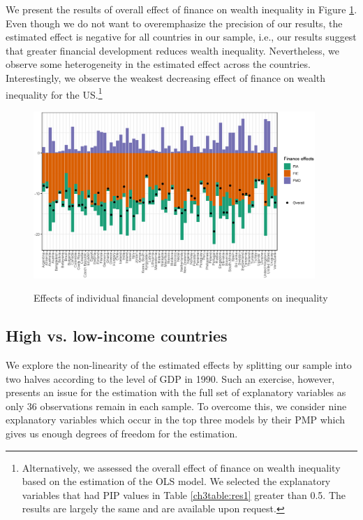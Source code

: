\begin{refsection}
We present the results of overall effect of finance on wealth inequality in Figure \ref{ch3fig:finance_effect}. Even though we do not want to overemphasize the precision of our results, the estimated effect is negative for all countries in our sample, i.e., our results suggest that greater financial development reduces wealth inequality. Nevertheless, we observe some heterogeneity in the estimated effect across the countries. Interestingly, we observe the weakest decreasing effect of finance on wealth inequality for the \ac{US}.\footnote{Alternatively, we assessed the overall effect of finance on wealth inequality based on the estimation of the \ac{OLS} model. We selected the explanatory variables that had \ac{PIP} values in Table \ref{ch3table:res1} greater than 0.5. The results are largely the same and are available upon request.}

\begin{figure}
\begin{center}
\caption{Effects of individual financial development components on inequality}
\includegraphics[width=0.95\textwidth]{figures/ch3/finance_effect.eps}
\label{ch3fig:finance_effect}
\end{center}
\end{figure}

\subsection{High vs. low-income countries}
We explore the non-linearity of the estimated effects by splitting our sample into two halves according to the level of GDP in 1990. Such an exercise, however, presents an issue for the estimation with the full set of explanatory variables as only 36 observations remain in each sample. To overcome this, we consider nine explanatory variables which occur in the top three models by their \ac{PMP} which gives us enough degrees of freedom for the estimation. 


\end{refsection}
